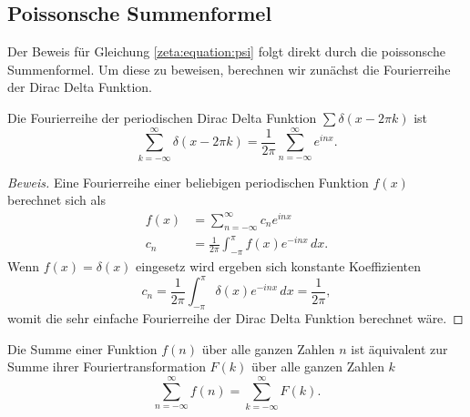 \subsection{Poissonsche Summenformel} \label{zeta:subsec:poisson_summation}

Der Beweis für Gleichung \ref{zeta:equation:psi} folgt direkt durch die poissonsche Summenformel.
Um diese zu beweisen, berechnen wir zunächst die Fourierreihe der Dirac Delta Funktion.

\begin{lemma}
    Die Fourierreihe der periodischen Dirac Delta Funktion $\sum \delta(x - 2\pi k)$ ist
    \begin{equation} \label{zeta:equation:fourier_dirac}
        \sum_{k=-\infty}^{\infty}
        \delta(x - 2\pi k)
        =
        \frac{1}{2\pi}
        \sum_{n=-\infty}^{\infty}
        e^{i n x}.
    \end{equation}
\end{lemma}

\begin{proof}[Beweis]
    Eine Fourierreihe einer beliebigen periodischen Funktion $f(x)$ berechnet sich als
    \begin{align}
        f(x)
        &=
        \sum_{n=-\infty}^{\infty}
        c_n
        e^{i n x} \\
        c_n
        &=
        \frac{1}{2\pi}
        \int_{-\pi}^{\pi}
        f(x)
        e^{-i n x}
        \, dx.
    \end{align}
    Wenn $f(x)=\delta(x)$ eingesetz wird ergeben sich konstante Koeffizienten
    \begin{equation}
        c_n
        =
        \frac{1}{2\pi}
        \int_{-\pi}^{\pi}
        \delta(x)
        e^{-i n x}
        \, dx
        =
        \frac{1}{2\pi},
    \end{equation}
    womit die sehr einfache Fourierreihe der Dirac Delta Funktion berechnet wäre.
\end{proof}

\begin{satz}
    Die Summe einer Funktion $f(n)$ über alle ganzen Zahlen $n$ ist äquivalent zur Summe ihrer Fouriertransformation $F(k)$ über alle ganzen Zahlen $k$
    \begin{equation}
        \sum_{n=-\infty}^{\infty}
        f(n)
        =
        \sum_{k=-\infty}^{\infty}
        F(k).
    \end{equation}
\end{satz}

